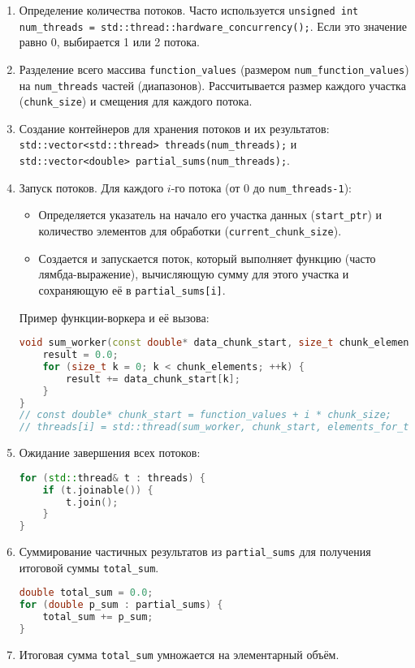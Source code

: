 \documentclass[12pt]{article}
\begin{document}
\begin{enumerate}
    \item Определение количества потоков. Часто используется \texttt{unsigned int num\_threads = std::thread::hardware\_concurrency();}. Если это значение равно 0, выбирается 1 или 2 потока.
    \item Разделение всего массива \texttt{function\_values} (размером \texttt{num\_function\_values}) на \texttt{num\_threads} частей (диапазонов). Рассчитывается размер каждого участка (\texttt{chunk\_size}) и смещения для каждого потока.
    \item Создание контейнеров для хранения потоков и их результатов: \texttt{std::vector<std::thread> threads(num\_threads);} и \texttt{std::vector<double> partial\_sums(num\_threads);}.
    \item Запуск потоков. Для каждого $i$-го потока (от 0 до \texttt{num\_threads-1}):
        \begin{itemize}
            \item Определяется указатель на начало его участка данных (\texttt{start\_ptr}) и количество элементов для обработки (\texttt{current\_chunk\_size}).
            \item Создается и запускается поток, который выполняет функцию (часто лямбда-выражение), вычисляющую сумму для этого участка и сохраняющую её в \texttt{partial\_sums[i]}.
        \end{itemize}
    Пример функции-воркера и её вызова:
\begin{lstlisting}[language=C++, basicstyle=\small\ttfamily, frame=none, numbers=none]
void sum_worker(const double* data_chunk_start, size_t chunk_elements, double& result) {
    result = 0.0;
    for (size_t k = 0; k < chunk_elements; ++k) {
        result += data_chunk_start[k];
    }
}
// const double* chunk_start = function_values + i * chunk_size;
// threads[i] = std::thread(sum_worker, chunk_start, elements_for_this_thread, std::ref(partial_sums[i]));
\end{lstlisting}
    \item Ожидание завершения всех потоков:
\begin{lstlisting}[language=C++, basicstyle=\small\ttfamily, frame=none, numbers=none]
for (std::thread& t : threads) {
    if (t.joinable()) {
        t.join();
    }
}
\end{lstlisting}
    \item Суммирование частичных результатов из \texttt{partial\_sums} для получения итоговой суммы \texttt{total\_sum}.
\begin{lstlisting}[language=C++, basicstyle=\small\ttfamily, frame=none, numbers=none]
double total_sum = 0.0;
for (double p_sum : partial_sums) {
    total_sum += p_sum;
}
\end{lstlisting}
    \item Итоговая сумма \texttt{total\_sum} умножается на элементарный объём.
\end{enumerate}
\end{document}
